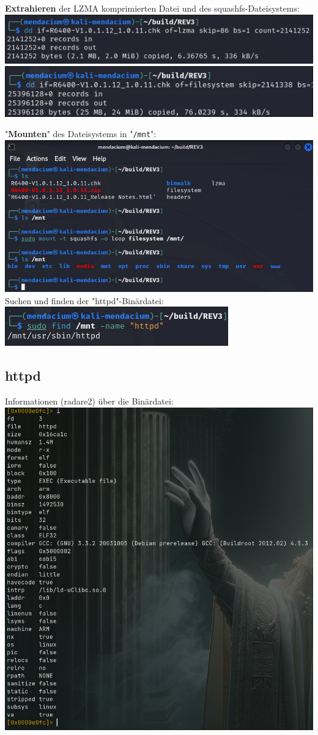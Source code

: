 \documentclass{article}
\begin{document}
	\noindent\textbf{Extrahieren} der LZMA komprimierten Datei und des squashfs-Dateisystems:\\
	\includegraphics[width=0.4\linewidth]{"pictures/1.3 extract lzma.png"}\\
	\includegraphics[width=0.4\linewidth]{"pictures/1.4 extract filesystem.png"}\\
	
	\pagebreak
	
	\noindent"\textbf{Mounten}" des Dateisystems in "\texttt{/mnt}":\\
	\includegraphics[width=0.4\linewidth]{"pictures/1.5 mount squashfs.png"}\\
	Suchen und finden der "httpd"-Binärdatei:\\
	\includegraphics[width=0.4\linewidth]{"pictures/1.6 find httpd.png"}\\

	\subsection*{httpd}
	Informationen (radare2) über die Binärdatei:\\
	\includegraphics[width=0.4\linewidth]{"pictures/1.7 architecture, entry point.png"}\\
	
	\label{LastPage}
	
\end{document}
